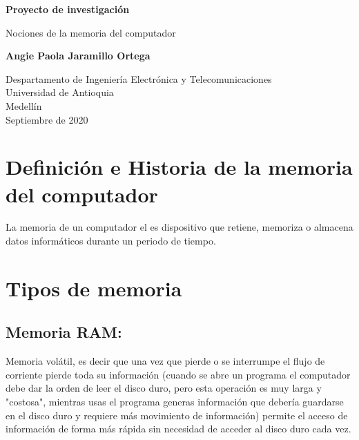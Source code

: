 \documentclass{article}
\begin{document}
\begin{titlepage}
    \begin{center}
        \vspace*{1cm}
            
        \Huge
        \textbf{Proyecto de investigación}
            
        \vspace{0.5cm}
        \LARGE
        Nociones de la memoria del computador
            
        \vspace{1.5cm}
            
        \textbf{Angie Paola Jaramillo Ortega}
            
        \vfill
            
        \vspace{0.8cm}
            
        \Large
        Despartamento de Ingeniería Electrónica y Telecomunicaciones\\
        Universidad de Antioquia\\
        Medellín\\
        Septiembre de 2020
            
    \end{center}
\end{titlepage}

\section{Definición e Historia de la memoria del computador}
La memoria de un computador el es dispositivo que retiene, memoriza o almacena datos informáticos durante un periodo de tiempo.

\section{Tipos de memoria}

\subsection{Memoria RAM:}
Memoria volátil, es decir que una vez que pierde o se interrumpe el flujo de corriente pierde toda su información (cuando se abre un programa el computador debe dar la orden de leer el disco duro, pero esta operación es muy larga y "costosa", mientras usas el programa generas información que debería guardarse en el disco duro y requiere más movimiento de información) permite el acceso de información de forma más rápida sin necesidad de acceder al disco duro cada vez.
\end{document}
